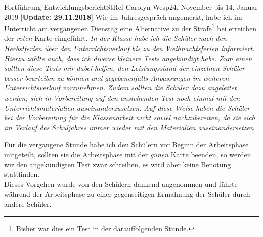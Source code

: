 \documentclass[oneside,openany,headings=optiontotoc,11pt,numbers=noenddot]{article}
\begin{document}
\begin{worksheet}{Fortführung Entwicklungsbericht}{StRef\grq{} Carolyn Wesp}{24. November bis 14. Januar 2019}
		\setlength{\leftskip}{1cm}
		\noindent
		\textbf{$\lbrack$Update: 29.11.2018$\rbrack$} Wie im Jahresgespräch angemerkt, habe ich im Unterricht am vergangenen Dienstag eine Alternative zu der \grqq{}Strafe\grqq{}\footnote{Bisher war dies ein Test in der darauffolgenden Stunde.} bei erreichen der \textit{roten} Karte eingeführt.
		\textit{In der Klasse habe ich die Schüler nach den Herbstferien über den Unterrichtsverlauf bis zu den Weihnachtsferien informiert. Hierzu zählte auch, dass ich diverse kleinere Tests angekündigt habe. Zum einen sollten diese Tests mir dabei helfen, den Leistungsstand der einzelnen Schüler besser beurteilen zu können und gegebenenfalls Anpassungen im weiteren Unterrichtsverlauf vorzunehmen. Zudem sollten die Schüler dazu angeleitet werden, sich in Vorbereitung auf den anstehenden Test noch einmal mit den Unterrichtsmaterialien auseinanderzusetzen. Auf diese Weise haben die Schüler bei der Vorbereitung für die Klassenarbeit nicht soviel nachzubereiten, da sie sich im Verlauf des Schuljahres immer wieder mit den Materialien auseinandersetzen.}
		\par
		\setlength{\leftskip}{0cm}
		\noindent
		Für die vergangene Stunde habe ich den Schülern vor Beginn der Arbeitsphase mitgeteilt, sollten sie die Arbeitsphase mit der \textit{günen} Karte beenden, so werden wir den angekündigten Test zwar schreiben, es wird aber keine Benotung stattfinden.\\
		Dieses Vorgehen wurde von den Schülern dankend angenommen und führte während der Arbeitsphase zu einer gegenseitigen Ermahnung der Schüler durch andere Schüler.
		

\end{worksheet}
\end{document}
